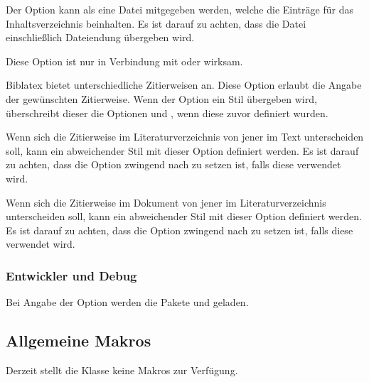 \documentclass[babel=ngerman,highlight=false]{skdoc}
\begin{document}
                Der Option kann als  eine Datei mitgegeben werden, welche die Einträge für das Inhaltsverzeichnis beinhalten. Es ist darauf zu achten, dass die Datei einschließlich Dateiendung übergeben wird.
                Diese Option ist nur in Verbindung mit  oder  wirksam.\medskip

                Biblatex bietet unterschiedliche Zitierweisen an. Diese Option erlaubt die Angabe der gewünschten Zitierweise. Wenn der Option ein Stil übergeben wird, überschreibt dieser die Optionen  und , wenn diese zuvor definiert wurden.\medskip

                Wenn sich die Zitierweise im Literaturverzeichnis von jener im Text unterscheiden soll, kann ein abweichender Stil mit dieser Option definiert werden. Es ist darauf zu achten, dass die Option zwingend nach  zu setzen ist, falls diese verwendet wird.\medskip

                Wenn sich die Zitierweise im Dokument von jener im Literaturverzeichnis unterscheiden soll, kann ein abweichender Stil mit dieser Option definiert werden. Es ist darauf zu achten, dass die Option zwingend nach  zu setzen ist, falls diese verwendet wird.\medskip

            \subsubsection{Entwickler und Debug}
                Bei Angabe der Option werden die Pakete  und  geladen.

        \subsection{Allgemeine Makros}
            Derzeit stellt die Klasse keine Makros zur Verfügung.
\end{document}
